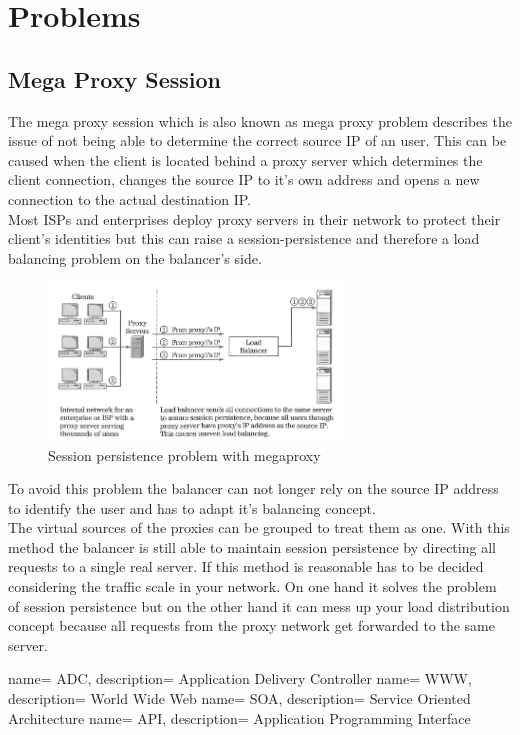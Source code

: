 \documentclass[12p]{article}
\begin{document}
	\newpage
	\section{Problems}
	\subsection{Mega Proxy Session}
	The mega proxy session which is also known as mega proxy problem describes the issue of not being able to determine the correct source IP of an user. This can be caused when the client is located behind a proxy server which determines the client connection, changes the source IP to it's own address and opens a new connection to the actual destination IP.\\
	Most ISPs and enterprises deploy proxy servers in their network to protect their client's identities but this can raise a session-persistence and therefore a load balancing problem on the balancer's side.
	\begin{figure}[h!]
		\centering
		\includegraphics[width=0.7\textwidth]{img/SessionPersistanceProblem.png}
		\caption{Session persistence problem with megaproxy \cite{lb_SFC}}
	\end{figure}
	To avoid this problem the balancer can not longer rely on the source IP address to identify the user and has to adapt it's balancing concept.\\
	The virtual sources of the proxies can be grouped to treat them as one. With this method the balancer is still able to maintain session persistence by directing all requests to a single real server. If this method is reasonable has to be decided considering the traffic scale in your network. On one hand it solves the problem of session persistence but on the other hand it can mess up your load distribution concept because all requests from the proxy network get forwarded to the same server.
	
	\newpage
	\listoffigures
	 {
		name= ADC,
		description= {Application Delivery Controller}
	}
	 {
		name= WWW,
		description= {World Wide Web}
	}
	 {
		name= SOA,
		description= {Service Oriented Architecture}
	}
	 {
		name= API,
		description= {Application Programming Interface}
	}
	\printglossaries
	
	\newpage
	
	
	
\end{document}
